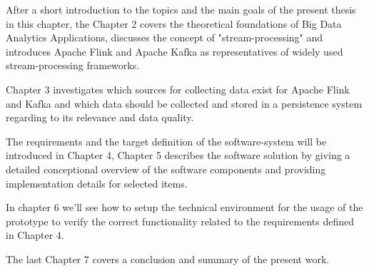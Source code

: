 After a short introduction to the topics and the main goals of the present thesis in this
chapter, the Chapter 2 covers the theoretical foundations of Big Data Analytics
Applications, discusses the concept of "stream-processing" and introduces Apache Flink
and Apache Kafka as representatives of widely used stream-processing frameworks.

Chapter 3 investigates which sources for collecting data exist for Apache Flink and Kafka
and which data should be collected and stored in a persistence system regarding to its
relevance and data quality.

The requirements and the target definition of the software-system will be introduced
in Chapter 4, Chapter 5 describes the software solution by giving a detailed conceptional
overview of the software components and providing implementation details for selected items.

In chapter 6 we'll see how to setup the technical environment for the usage of the
prototype to verify the correct functionality related to the requirements defined in
Chapter 4.

The last Chapter 7 covers a conclusion and summary of the present work.

